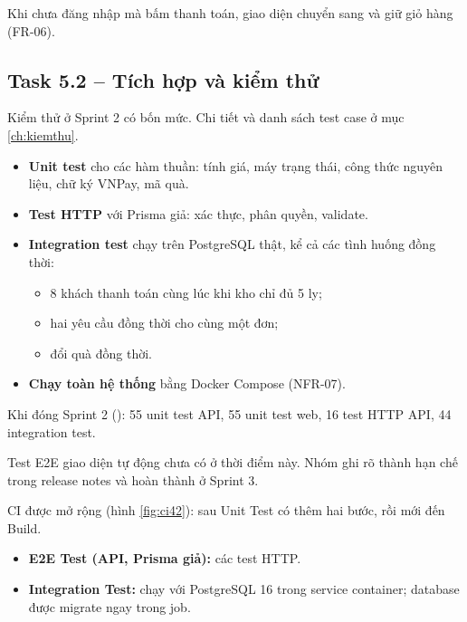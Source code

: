 Khi chưa đăng nhập mà bấm thanh toán, giao diện chuyển sang  và giữ giỏ hàng (FR-06).

\subsection{Task 5.2 -- Tích hợp và kiểm thử}
Kiểm thử ở Sprint 2 có bốn mức. Chi tiết và danh sách test case ở mục \ref{ch:kiemthu}.

\begin{itemize}
\item \textbf{Unit test} cho các hàm thuần: tính giá, máy trạng thái, công thức nguyên liệu, chữ ký VNPay, mã quà.
\item \textbf{Test HTTP} với Prisma giả: xác thực, phân quyền, validate.
\item \textbf{Integration test} chạy trên PostgreSQL thật, kể cả các tình huống đồng thời:
  \begin{itemize}
  \item 8 khách thanh toán cùng lúc khi kho chỉ đủ 5 ly;
  \item hai yêu cầu đồng thời cho cùng một đơn;
  \item đổi quà đồng thời.
  \end{itemize}
\item \textbf{Chạy toàn hệ thống} bằng Docker Compose (NFR-07).
\end{itemize}

Khi đóng Sprint 2 (): 55 unit test API, 55 unit test web, 16 test HTTP API, 44 integration test.

Test E2E giao diện tự động chưa có ở thời điểm này. Nhóm ghi rõ thành hạn chế trong release notes  và hoàn thành ở Sprint 3.

CI được mở rộng (hình \ref{fig:ci42}): sau Unit Test có thêm hai bước, rồi mới đến Build.
\begin{itemize}
\item \textbf{E2E Test (API, Prisma giả):} các test HTTP.
\item \textbf{Integration Test:} chạy với PostgreSQL 16 trong service container; database được migrate ngay trong job.
\end{itemize}


